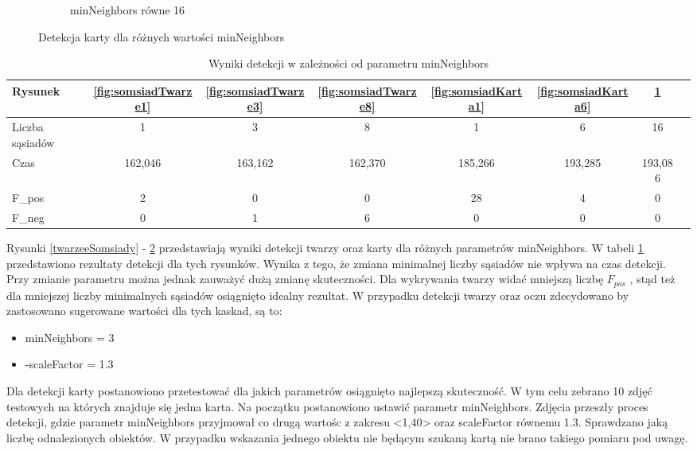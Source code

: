 \documentclass{article}
\numberwithin{equation}{section}
\begin{document}
\begin{figure}[H]
\begin{subfigure}{0.32\textwidth}
        \caption{minNeighbors równe 16}
        \label{fig:somsiadKarta16}
    \end{subfigure}
    \caption{Detekcja karty dla różnych wartości minNeighbors}
    \label{kartySomsiady}
\end{figure}


\begin{table}[H]
    \caption{Wyniki detekcji w zależności od parametru minNeighbors}
    \label{tab:somsiady}
    \begin{tabular}{|l|c|c|c|c|c|c|c|}
\hline
Rysunek & \ref{fig:somsiadTwarze1} & \ref{fig:somsiadTwarze3} & \ref{fig:somsiadTwarze8} & \ref{fig:somsiadKarta1} & \ref{fig:somsiadKarta6} & \ref{fig:somsiadKarta16}\\
\hline
Liczba sąsiadów & 1 & 3 & 8 & 1 & 6 & 16\\
\hline
Czas & 162,046 & 163,162 & 162,370 & 185,266 & 193,285 & 193,086\\
\hline
F_{pos} & 2 & 0 & 0 & 28 & 4 & 0\\
\hline
F_{neg} & 0 & 1 & 6 & 0 & 0 & 0\\
\hline
\end{tabular}
\end{table}

Rysunki \ref{twarzeeSomsiady} - \ref{kartySomsiady} przedstawiają wyniki detekcji twarzy oraz karty dla różnych parametrów minNeighbors. W tabeli \ref{tab:somsiady} przedstawiono rezultaty detekcji dla tych rysunków. Wynika z tego, że zmiana minimalnej liczby sąsiadów nie wpływa na czas detekcji. Przy zmianie parametru można jednak zauważyć dużą zmianę skuteczności. Dla wykrywania twarzy widać mniejszą liczbę ${F_{pos}}$ , stąd też dla mniejszej liczby minimalnych sąsiadów osiągnięto idealny rezultat.
W przypadku detekcji twarzy oraz oczu zdecydowano by zastosowano sugerowane wartości dla tych kaskad, są to:
\begin{itemize}
    \item minNeighbors = 3
    \item -scaleFactor = 1.3
\end{itemize}

Dla detekcji karty postanowiono przetestować dla jakich parametrów osiągnięto najlepszą skuteczność. W tym celu zebrano 10 zdjęć testowych na których znajduje się jedna karta. Na początku postanowiono ustawić parametr minNeighbors.
Zdjęcia przeszły proces detekcji, gdzie parametr minNeighbors przyjmował co drugą wartośc z zakresu <1,40> oraz scaleFactor równemu 1.3. Sprawdzano jaką liczbę odnalezionych obiektów. W przypadku wskazania jednego obiektu nie będącym szukaną kartą nie brano takiego pomiaru pod uwagę.
\end{document}
